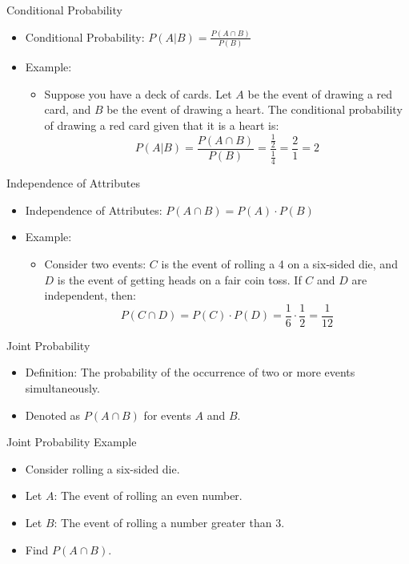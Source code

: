 \documentclass{beamer}
\begin{document}
\begin{frame}{Conditional Probability}
  \begin{itemize}
    \item Conditional Probability: \( P(A | B) = \frac{P(A \cap B)}{P(B)} \)
    \item Example:
      \begin{itemize}
        \item Suppose you have a deck of cards. Let \( A \) be the event of drawing a red card, and \( B \) be the event of drawing a heart. The conditional probability of drawing a red card given that it is a heart is:
        \[ P(A | B) = \frac{P(A \cap B)}{P(B)} = \frac{\frac{1}{2}}{\frac{1}{4}} = \frac{2}{1} = 2 \]
      \end{itemize}
  \end{itemize}
\end{frame}

\begin{frame}{Independence of Attributes}
  \begin{itemize}
    \item Independence of Attributes: \( P(A \cap B) = P(A) \cdot P(B) \)
    \item Example:
      \begin{itemize}
        \item Consider two events: \( C \) is the event of rolling a 4 on a six-sided die, and \( D \) is the event of getting heads on a fair coin toss. If \( C \) and \( D \) are independent, then:
        \[ P(C \cap D) = P(C) \cdot P(D) = \frac{1}{6} \cdot \frac{1}{2} = \frac{1}{12} \]
      \end{itemize}
  \end{itemize}
\end{frame}


\begin{frame}{Joint Probability}
  \begin{itemize}
    \item Definition: The probability of the occurrence of two or more events simultaneously.
    \item Denoted as \( P(A \cap B) \) for events \( A \) and \( B \).
  \end{itemize}
\end{frame}

\begin{frame}{Joint Probability Example}
  \begin{itemize}
    \item Consider rolling a six-sided die.
    \item Let \( A \): The event of rolling an even number.
    \item Let \( B \): The event of rolling a number greater than 3.
    \item Find \( P(A \cap B) \).
  \end{itemize}
\end{frame}
\end{document}
